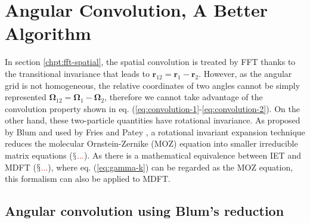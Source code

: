 
\chapter{Angular Convolution, A Better Algorithm\label{chpt:angular-convolution}}

In section \ref{chpt:fft-spatial}, the spatial convolution is treated
by \acs{FFT} thanks to the transitional invariance that leads to
$\mathbf{r}_{12}=\mathbf{r}_{1}-\mathbf{r}_{2}$. However, as the
angular grid is not homogeneous, the relative coordinates of two angles
cannot be simply represented $\mathbf{\Omega}_{12}=\mathbf{\Omega}_{1}-\mathbf{\Omega}_{2}$,
therefore we cannot take advantage of the convolution property shown
in eq. (\ref{eq:convolution-1}-\ref{eq:convolution-2}). On the other
hand, these two-particle quantities have rotational invariance. As
proposed by Blum \citep{Blum_I,Blum_II} and used by Fries and Patey
\citep{Fries_Patey_1985}, a rotational invariant expansion technique
reduces the molecular Ornstein-Zernike (\acs{MOZ}) equation into
smaller irreducible matrix equations ($\mathsection$\textcolor{red}{...}).
As there is a mathematical equivalence between \acs{IET} and \acs{MDFT}
($\mathsection$\textcolor{red}{...}), where eq. (\ref{eq:gamma-k})
can be regarded as the \acs{MOZ} equation, this formalism can also
be applied to \acs{MDFT}.

\section{Angular convolution using Blum's reduction}

